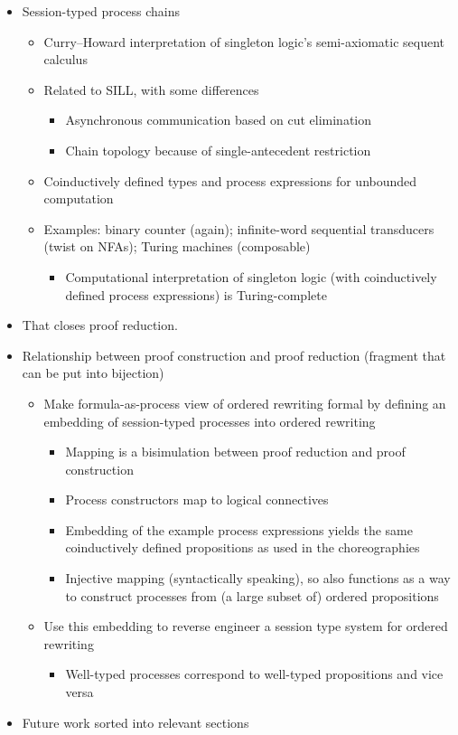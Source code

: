 \begin{itemize}
\item Session-typed process chains
  \begin{itemize}[nosep]
  \item Curry--Howard interpretation of singleton logic's semi-axiomatic sequent calculus
  \item Related to SILL, with some differences
    \begin{itemize}[nosep]
    \item Asynchronous communication based on cut elimination
    \item Chain topology because of single-antecedent restriction
    \end{itemize}
  \item Coinductively defined types and process expressions for unbounded computation
  \item Examples: binary counter (again); infinite-word sequential transducers (twist on NFAs); Turing machines (composable)
    \begin{itemize}[nosep]
    \item Computational interpretation of singleton logic (with coinductively defined process expressions) is Turing-complete
    \end{itemize}
  \end{itemize}

\item That closes proof reduction.

\item Relationship between proof construction and proof reduction (fragment that can be put into bijection)
  \begin{itemize}[nosep]
  \item Make formula-as-process view of ordered rewriting formal by defining an embedding of session-typed processes into ordered rewriting
    \begin{itemize}[nosep]
    \item Mapping is a bisimulation between proof reduction and proof construction
    \item Process constructors map to logical connectives
    \item Embedding of the example process expressions yields the same coinductively defined propositions as used in the choreographies
    \item Injective mapping (syntactically speaking), so also functions as a way to construct processes from (a large subset of) ordered propositions
    \end{itemize}
  \item Use this embedding to reverse engineer a session type system for ordered rewriting
    \begin{itemize}[nosep]
    \item Well-typed processes correspond to well-typed propositions and vice versa
    \end{itemize}
  \end{itemize}

\item Future work sorted into relevant sections
\end{itemize}

